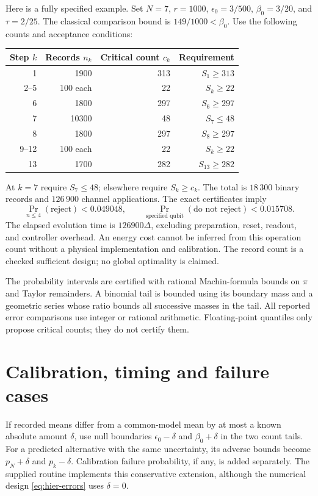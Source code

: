 Here is a fully specified example. Set $N=7$, $r=1000$,
$\epsilon_0=3/500$, $\beta_0=3/20$, and $\tau=2/25$.
The classical comparison bound is $149/1000<\beta_0$.
Use the following counts and acceptance conditions:
\begin{center}
\begin{tabular}{rrrr}
Step $k$ & Records $n_k$ & Critical count $c_k$ & Requirement\\
\hline
1 &1900&313&$S_1\ge313$\\
2--5 &100 each&22&$S_k\ge22$\\
6 &1800&297&$S_6\ge297$\\
7 &10300&48&$S_7\le48$\\
8 &1800&297&$S_8\ge297$\\
9--12 &100 each&22&$S_k\ge22$\\
13 &1700&282&$S_{13}\ge282$
\end{tabular}
\end{center}
At $k=7$ require $S_7\le48$; elsewhere require $S_k\ge c_k$.
The total is $18\,300$ binary records and $126\,900$ channel applications.
The exact certificates imply
\begin{equation}
 \Pr_{n\le4}(\text{reject})<0.049048,
 \qquad
 \Pr_{\text{specified qubit}}(\text{do not reject})<0.015708.
                                                        \label{eq:hier-errors}
\end{equation}
The elapsed evolution time is $126900\Delta$, excluding preparation,
reset, readout, and controller overhead. An energy cost cannot be inferred
from this operation count without a physical implementation and calibration.
The record count is a checked sufficient design; no global optimality is claimed.

The probability intervals are certified with rational Machin-formula bounds
on $\pi$ and Taylor remainders. A binomial tail is bounded using its boundary
mass and a geometric series whose ratio bounds all successive masses in the
tail. All reported error comparisons use integer or rational arithmetic.
Floating-point quantiles only propose critical counts; they do not certify them.

\section{Calibration, timing and failure cases}
If recorded means differ from a common-model mean by at most a known absolute
amount $\delta$, use null boundaries $\epsilon_0-\delta$ and
$\beta_0+\delta$ in the two count tails. For a predicted alternative with the
same uncertainty, its adverse bounds become $p_N+\delta$ and
$p_k-\delta$. Calibration failure probability, if any, is added separately.
The supplied routine implements this conservative extension, although the
numerical design \eqref{eq:hier-errors} uses $\delta=0$.

